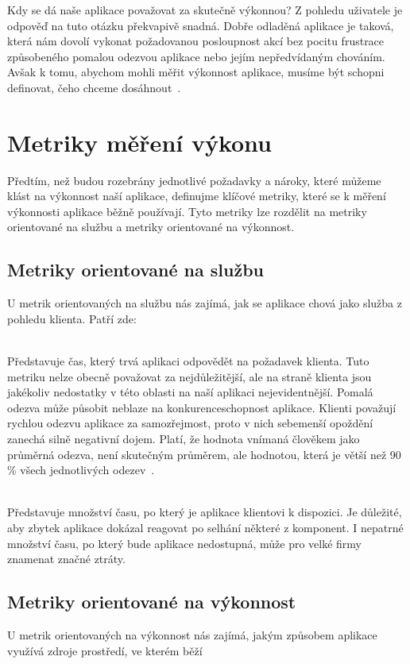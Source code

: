 \documentclass[122pt,oneside]{fithesis}
\begin{document}
Kdy se dá naše aplikace považovat za skutečně výkonnou? Z pohledu uživatele je odpověď na tuto otázku překvapivě snadná. Dobře odladěná aplikace je taková, která nám dovolí vykonat požadovanou posloupnost akcí bez pocitu frustrace způsobeného pomalou odezvou aplikace nebo jejím nepředvídaným chováním. Avšak k tomu, abychom mohli měřit výkonnost aplikace, musíme být schopni definovat, čeho chceme dosáhnout~\cite{molyneaux09}.

\section{Metriky měření výkonu}
Předtím, než budou rozebrány jednotlivé požadavky a nároky, které můžeme klást na výkonnost naší aplikace, definujme klíčové metriky, které se k měření výkonnosti aplikace běžně používají. Tyto metriky lze rozdělit na metriky orientované na službu a metriky orientované na výkonnost.
\subsection{Metriky orientované na službu}
U metrik orientovaných na službu nás zajímá, jak se aplikace chová jako služba z pohledu klienta. Patří zde: 

\vspace{5 mm}
\\\indent Představuje čas, který trvá aplikaci odpovědět na požadavek klienta. Tuto metriku nelze obecně považovat za nejdůležitější, ale na straně klienta jsou jakékoliv nedostatky v této oblasti na naší aplikaci nejevidentnější. Pomalá odezva může působit neblaze na konkurenceschopnost aplikace. Klienti považují rychlou odezvu aplikace za samozřejmost, proto v nich sebemenší opoždění zanechá silně negativní dojem. Platí, že hodnota vnímaná člověkem jako průměrná odezva, není skutečným průměrem, ale hodnotou, která je větší než 90 \% všech jednotlivých odezev~\cite{haines06}.

\vspace{5 mm}
\\\indent Představuje množství času, po který je aplikace klientovi k dispozici. Je důležité, aby zbytek aplikace dokázal reagovat po selhání některé z komponent. I nepatrné množství času, po který bude aplikace nedostupná, může pro velké firmy znamenat značné ztráty.

\subsection{Metriky orientované na výkonnost}
U metrik orientovaných na výkonnost nás zajímá, jakým způsobem aplikace využívá zdroje prostředí, ve kterém běží
\end{document}
